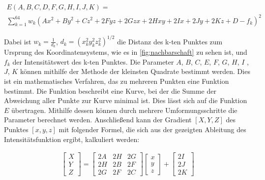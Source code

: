 \begin{equation}
\begin{array}{l}
  E(A,B,C,D,F,G,H,I,J,K) = \\
	\sum\limits_{k=1}^{64}  w_{k}(Ax^{2}+By^{2}+Cz^{2}+2Fyz+2Gzx+2Hxy+2Ix+2Jy+2Kz+D - f_{k})^2
\end{array}
\end{equation}


Dabei ist $w_{k} = \frac{1}{d_{k}}$, $d_{k} =(x_{k}^2y_{k}^2z_{k}^2)^{1/2}$  die Distanz des k-ten Punktes zum Ursprung des Koordinatensystems, wie es in \autoref{fig:nachbarschaft} zu sehen ist, und $f_{k}$ der Intensitätswert des k-ten Punktes. 
\newline
Die Parameter $A$, $B$, $C$, $E$, $F$, $G$, $H$, $I$ ,$J$, $K$  können mithilfe der Methode der kleinsten Quadrate bestimmt werden. Dies ist ein mathematisches Verfahren, das zu mehreren Punkten eine Funktion bestimmt. Die Funktion beschreibt eine Kurve, bei der die Summe der Abweichung aller Punkte zur Kurve minimal ist. Dies lässt sich auf die Funktion $E$ übertragen. Mithilfe dessen können durch mehrere Umformungsschritte die Parameter berechnet werden. Anschließend kann der Gradient $[X, Y, Z]$ des Punktes $[x, y, z]$ mit folgender Formel, die sich aus der gezeigten Ableitung des Intensitätsfunktion ergibt, kalkuliert werden:


\begin{align}
\begin{bmatrix}
           X \\
           Y \\
           Z
         \end{bmatrix}    
 	= \begin{bmatrix}
           2A & 2H & 2G \\
           2H & 2B & 2F \\
           2G & 2F & 2C
         \end{bmatrix}
         \begin{bmatrix}
           x \\
           y \\
           z
         \end{bmatrix}
	+\begin{bmatrix}
           2I \\
           2J \\
           2K
         \end{bmatrix}
  \end{align}



